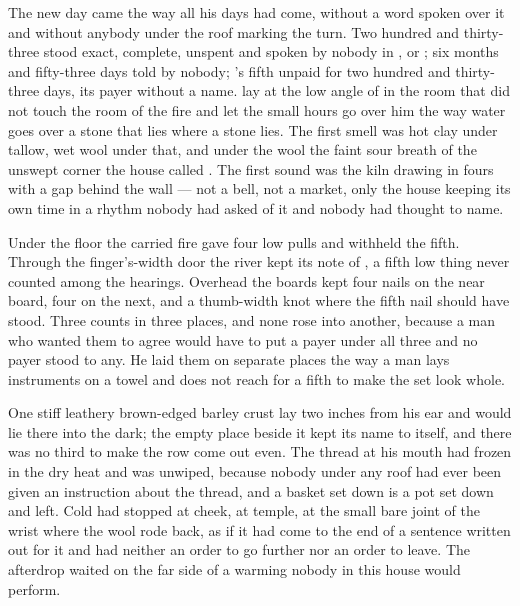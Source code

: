 
The new day came the way all his days had come, without a word spoken over it and without anybody under the roof marking the turn. Two hundred and thirty-three stood exact, complete, unspent and spoken by nobody in ,  or ; six months and fifty-three days told by nobody; 's fifth unpaid for two hundred and thirty-three days, its payer without a name.  lay at the low angle of  in the room that did not touch the room of the fire and let the small hours go over him the way water goes over a stone that lies where a stone lies. The first smell was hot clay under tallow, wet wool under that, and under the wool the faint sour breath of the unswept corner the house called . The first sound was the kiln drawing in fours with a gap behind the wall --- not a bell, not a market, only the house keeping its own time in a rhythm nobody had asked of it and nobody had thought to name.

Under the floor the carried fire gave four low pulls and withheld the fifth. Through the finger's-width door the river kept its note of , a fifth low thing never counted among the hearings. Overhead the boards kept four nails on the near board, four on the next, and a thumb-width knot where the fifth nail should have stood. Three counts in three places, and none rose into another, because a man who wanted them to agree would have to put a payer under all three and no payer stood to any. He laid them on separate places the way a man lays instruments on a towel and does not reach for a fifth to make the set look whole.

One stiff leathery brown-edged barley crust lay two inches from his ear and would lie there into the dark; the empty place beside it kept its name to itself, and there was no third to make the row come out even. The thread at his mouth had frozen in the dry heat and was unwiped, because nobody under any roof had ever been given an instruction about the thread, and a basket set down is a pot set down and left. Cold had stopped at cheek, at temple, at the small bare joint of the wrist where the wool rode back, as if it had come to the end of a sentence written out for it and had neither an order to go further nor an order to leave. The afterdrop waited on the far side of a warming nobody in this house would perform.

